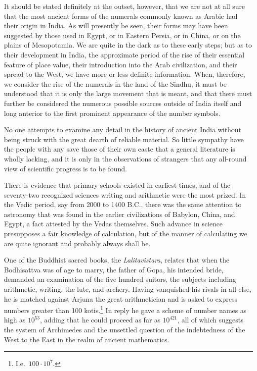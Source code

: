\documentclass[11pt,a4paper]{article}
\begin{document}
It should be stated definitely at the outset, however, that we are not at all sure that the most ancient forms of the numerals commonly known as Arabic had their origin in India. As will presently be seen, their forms may have been suggested by those used in Egypt, or in Eastern Persia, or in China, or on the plains of Mesopotamia. We are quite in the dark as to these early steps; but as to their development in India, the approximate period of the rise of their essential feature of place value, their introduction into the Arab civilization, and their spread to the West, we have more or less definite information. When, therefore, we consider the rise of the numerals in the land of the Sindhu, it must be understood that it is only the large movement that is meant, and that there must further be considered the numerous possible sources outside of India itself and long anterior to the first prominent appearance of the number symbols.

No one attempts to examine any detail in the history of ancient India without being struck with the great dearth of reliable material. So little sympathy have the people with any save those of their own caste that a general literature is wholly lacking, and it is only in the observations of strangers that any all-round view of scientific progress is to be found.

There is evidence that primary schools existed in earliest times, and of the seventy-two recognized sciences writing and arithmetic were the most prized. In the Vedic period, say from 2000 to 1400 B.C., there was the same attention to astronomy that was found in the earlier civilizations of Babylon, China, and Egypt, a fact attested by the Vedas themselves. Such advance in science presupposes a fair knowledge of calculation, but of the manner of calculating we are quite ignorant and probably always shall be.

One of the Buddhist sacred books, the \textit{Lalitavistara}, relates that when the Bodhisattva was of age to marry, the father of Gopa, his intended bride, demanded an examination of the five hundred suitors, the subjects including arithmetic, writing, the lute, and archery. Having vanquished his rivals in all else, he is matched against Arjuna the great arithmetician and is asked to express numbers greater than 100 kotis.\footnote{I.e.\ $100 \cdot 10^7$.} In reply he gave a scheme of number names as high as $10^{53}$, adding that he could proceed as far as $10^{421}$, all of which suggests the system of Archimedes and the unsettled question of the indebtedness of the West to the East in the realm of ancient mathematics.
\end{document}
